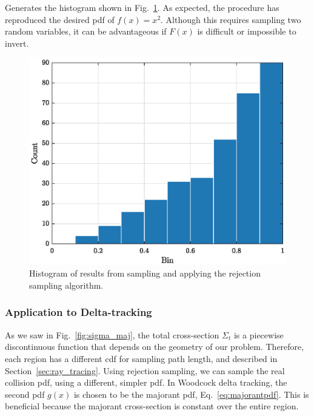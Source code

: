 Generates the histogram shown in Fig.~\ref{fig:pdf_histogram}. As
expected, the procedure has reproduced the desired \gls{pdf} of $f(x)
= x^2$. Although this requires sampling two random variables, it can be
advantageous if $F(x)$ is difficult or impossible to invert.
\begin{figure}[hbtp]
  \centering
  \includegraphics[scale=0.75]{images/pdf_histogram}
  \caption{Histogram of results from sampling and applying the
    rejection sampling algorithm.}
  \label{fig:pdf_histogram}
\end{figure}
\subsubsection{Application to Delta-tracking}
\label{sec:application_to_delta-tracking}

As we saw in Fig.~\ref{fig:sigma_maj}, the total cross-section
$\Sigma_t$ is a piecewise discontinuous function that depends on the
geometry of our problem. Therefore, each region has a different
\gls{cdf} for sampling path length, and described in
Section~\ref{sec:ray_tracing}. Using rejection sampling, we can sample
the real collision \gls{pdf}, using a different, simpler \gls{pdf}.
In Woodcock delta tracking, the second \gls{pdf} $g(x)$ is chosen to
be the majorant \gls{pdf}, Eq.~\eqref{eq:majorantpdf}. This is
beneficial because the majorant cross-section is constant over the
entire region.

